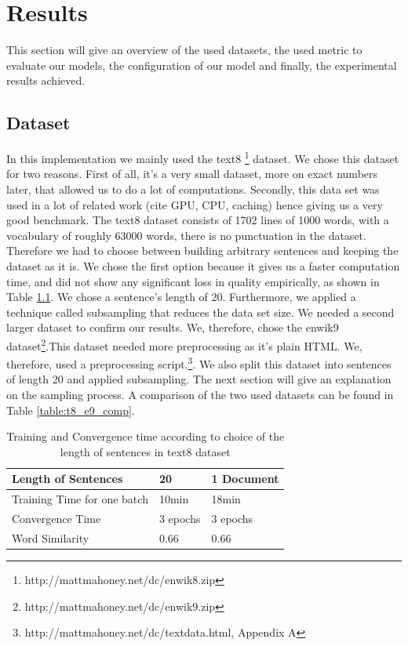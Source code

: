 
\chapter{Results}\label{chap:results}



This section will give an overview of the used datasets, the used metric to evaluate our models, the configuration of our model and finally, the experimental results achieved.

\section{Dataset}\label{sec:dataset}
In this implementation we mainly used the text8 \footnote{http://mattmahoney.net/dc/enwik8.zip} dataset. We chose this dataset for two reasons. First of all, it's a very small dataset, more on exact numbers later, that allowed us to do a lot of computations. Secondly, this data set was used in a lot of related work (cite GPU, CPU, caching) hence giving us a very good benchmark. The text8 dataset consists of 1702 lines of 1000 words, with a vocabulary of roughly 63000 words, there is no punctuation in the dataset. Therefore we had to choose between building arbitrary sentences and keeping the dataset as it is. We chose the first option because it gives us a faster computation time, and did not show any significant loss in quality empirically, as shown in Table \ref{table:with_20}. We chose a sentence's length of 20. Furthermore, we applied a technique called subsampling that reduces the data set size. 
We needed a second larger dataset to confirm our results.  We, therefore, chose the enwik9 dataset\footnote{http://mattmahoney.net/dc/enwik9.zip}.This dataset needed more preprocessing as it's plain HTML. We, therefore, used a preprocessing script.\footnote{http://mattmahoney.net/dc/textdata.html, Appendix A}. We also split this dataset into sentences of length 20 and applied subsampling. The next section will give an explanation on the sampling process. A comparison of the two used datasets can be found in Table \ref{table:t8_e9_comp}.
\begin{table}[]
\centering
\begin{tabular}{|l|l|l|}
\hline
Length of Sentences            & 20       & 1 Document \\ \hline
Training Time for one batch  & 10min    & 18min      \\ \hline
Convergence Time & 3 epochs & 3 epochs   \\ \hline
Word Similarity  & 0.66     & 0.66       \\ \hline
\end{tabular}
\caption{Training and Convergence time according to choice of the length of sentences in text8 dataset}
    \label{table:with_20}
\end{table}


